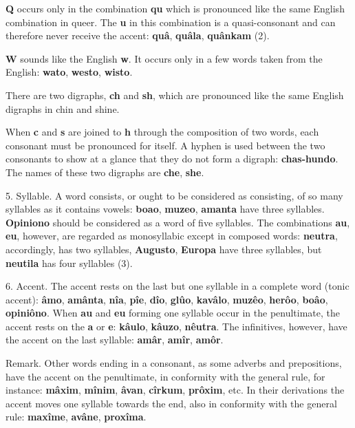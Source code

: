 \textbf{Q} occurs only in the combination \textbf{qu} which is pronounced like the same English combination in queer. The \textbf{u} in this combination is a quasi-consonant and can therefore never receive the accent: \textbf{quâ}, \textbf{quâla}, \textbf{quânkam} (2). 
    
\textbf{W} sounds like the English \textbf{w}. It occurs only in a few words taken from the English: \textbf{wato}, \textbf{westo}, \textbf{wisto}.
    
There are two digraphs, \textbf{ch} and \textbf{sh}, which are pronounced like the same English digraphs in chin and shine.
    
When \textbf{c} and \textbf{s} are joined to \textbf{h} through the composition of two words, each consonant must be pronounced for itself. A hyphen is used between the two consonants to show at a glance that they do not form a digraph: \textbf{chas-hundo}. The names of these two digraphs are \textbf{che}, \textbf{she}.
    
5. Syllable. A word consists, or ought to be considered as consisting, of so many syllables as it contains vowels: \textbf{boao}, \textbf{muzeo}, \textbf{amanta} have three syllables. \textbf{Opiniono} should be considered as a word of five syllables. The combinations \textbf{au}, \textbf{eu}, however, are regarded as monosyllabic except in composed words: \textbf{neutra}, accordingly, has two syllables, \textbf{Augusto}, \textbf{Europa} have three syllables, but \textbf{neutila} has four syllables (3). 
    
6. Accent. The accent rests on the last but one syllable in a complete word (tonic accent): \textbf{âmo}, \textbf{amânta}, \textbf{nîa}, \textbf{pîe}, \textbf{dîo}, \textbf{glûo}, \textbf{kavâlo}, \textbf{muzêo}, \textbf{herôo}, \textbf{boâo}, \textbf{opiniôno}. When \textbf{au} and \textbf{eu} forming one syllable occur in the penultimate, the accent rests on the \textbf{a} or \textbf{e}: \textbf{kâulo}, \textbf{kâuzo}, \textbf{nêutra}. The infinitives, however, have the accent on the last syllable: \textbf{amâr}, \textbf{amîr}, \textbf{amôr}. 

\small Remark. Other words ending in a consonant, as some adverbs and prepositions, have the accent on the penultimate, in conformity with the general rule, for instance: \textbf{mâxim}, \textbf{mînim}, \textbf{âvan}, \textbf{cîrkum}, \textbf{prôxim}, etc. In their derivations the accent moves one syllable towards the end, also in conformity with the general rule: \textbf{maxîme}, \textbf{avâne}, \textbf{proxîma}. \normalsize
    
